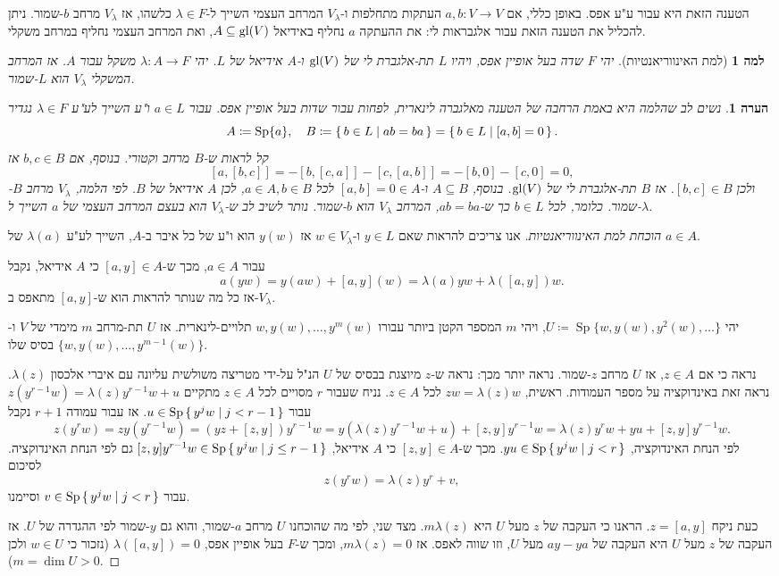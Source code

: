 \documentclass{report}
\theoremstyle{break}
\newtheorem{lemma}[lemma]{למה}
\newtheorem{remark}[remark]{הערה}
\theoremstyle{MyNonumberbreak}
\newtheorem{proof}{הוכחה}
\DeclareMathOperator{\Sp}{Sp}
\begin{document}
הטענה הזאת היא עבור ע"ע אפס. באופן כללי, אם $a, b : V \to V$ העתקות מתחלפות ו-$V_\lambda$ המרחב העצמי השייך ל-$\lambda \in F$ כלשהו, אז $V_\lambda$ מרחב $b$-שמור. ניתן להכליל את הטענה הזאת עבור אלגבראות לי: את ההעתקה $a$ נחליף באידיאל $A \subseteq \operatorname{gl}(V)$, ואת המרחב העצמי נחליף במרחב משקלי.
\begin{lemma}[למת האינווריאנטיות]
	יהי $F$ שדה בעל אופיין אפס, ויהיו $L$ תת-אלגברת לי של $\operatorname{gl}(V)$ ו-$A$ אידיאל של $L$. יהי $\lambda : A \to F$ משקל עבור $A$. אז המרחב המשקלי $V_\lambda$ הוא $L$-שמור.
\end{lemma}
\begin{remark}
	נשים לב שהלמה היא באמת הרחבה של הטענה מאלגברה לינארית, לפחות עבור שדות בעל אופיין אפס. עבור $a \in L$ ו"ע השייך לע"ע $\lambda \in F$ נגדיר 
	\[ A \coloneqq \Sp\{a\}, \quad B \coloneqq \set{b \in L | ab = ba} = \set{b \in L | [a, b] = 0}. \]
	קל לראות ש-$B$ מרחב וקטורי. בנוסף, אם $b, c \in B$ אז
	\[ [a, [b, c]] = -[b, [c, a]] - [c, [a, b]] = -[b, 0] - [c, 0] = 0, \]
	ולכן $[b, c] \in B$. אז $B$ תת-אלגברת לי של $\operatorname{gl}(V)$. בנוסף, $A \subseteq B$ ו-$[a, b] = 0 \in A$ לכל $a \in A, b \in B$, לכן $A$ אידיאל של $B$. לפי הלמה, $V_\lambda$ מרחב $B$-שמור. כלומר, לכל $b \in L$ כך ש-$ab = ba$, המרחב $V_\lambda$ הוא $b$-שמור. נותר לשיב לב ש-$V_\lambda$ הוא בעצם המרחב העצמי של $a$ השייך ל-$\lambda$.
\end{remark}
\begin{proof}[הוכחת למת האינווריאנטיות]
	אנו צריכים להראות שאם $y \in L$ ו-$w \in V_\lambda$ אז $y(w)$ הוא ו"ע של כל איבר ב-$A$, השייך לע"ע $\lambda(a)$ של $a \in A$.
	
	עבור $a \in A$, מכך ש-$[a, y] \in A$ כי $A$ אידיאל, נקבל
	\[ a(yw) = y(aw) + [a, y](w) = \lambda(a)yw + \lambda([a, y])w. \]
	אז כל מה שנותר להראות הוא ש-$[a, y]$ מתאפס ב-$V_\lambda$.
	
	יהי $U \coloneqq \Sp\{w, y(w), y^2(w), \ldots\}$, ויהי $m$ המספר הקטן ביותר עבורו $w, y(w), \ldots, y^m(w)$ תלויים-לינארית. אז $U$ תת-מרחב $m$ מימדי של $V$ ו-$\{w, y(w), \ldots, y^{m-1}(w)\}$ בסיס שלו.
	
	נראה כי אם $z \in A$, אז $U$ מרחב $z$-שמור. נראה יותר מכך: נראה ש-$z$ מיוצגת בבסיס של $U$ הנ"ל על-ידי מטריצה משולשית עליונה עם איברי אלכסון $\lambda(z)$. נראה זאת באינדוקציה על מספר העמודות. ראשית, $zw = \lambda(z)w$ לכל $z \in A$. נניח שעבור $r$ מסויים לכל $z \in A$ מתקיים $z(y^{r-1}w) = \lambda(z)y^{r-1}w + u$ עבור $u \in \Sp\set{y^jw | j < r-1}$. אז עבור עמודה $r+1$ נקבל
	\[ z(y^rw) = zy(y^{r-1}w) = (yz + [z, y])y^{r-1}w = y(\lambda(z)y^{r-1}w + u) + [z,y]y^{r-1}w = \lambda(z)y^rw + yu + [z, y]y^{r-1}w. \]
	לפי הנחת האינדוקציה, $yu \in \Sp\set{y^jw | j < r}$. מכך ש-$[z, y] \in A$ כי $A$ אידיאל, $[z, y]y^{r-1}w \in \Sp\set{y^jw | j \le r - 1}$ גם לפי הנחת האינדוקציה. לסיכום
	\[ z(y^rw) = \lambda(z)y^r + v, \]
	עבור $v \in \Sp\set{y^jw | j < r}$ וסיימנו.
	
	כעת ניקח $z = [a, y]$. הראנו כי העקבה של $z$ מעל $U$ היא $m\lambda(z)$. מצד שני, לפי מה שהוכחנו $U$ מרחב $a$-שמור, והוא גם $y$-שמור לפי ההגדרה של $U$. אז העקבה של $z$ מעל $U$ היא העקבה של $ay-ya$ מעל $U$, וזו שווה לאפס. אז $m\lambda(z) = 0$, ומכך ש-$F$ בעל אופיין אפס, $\lambda([a, y]) = 0$ (נזכור כי $w \in U$ ולכן $m = \dim U > 0$).
\end{proof}
\end{document}
